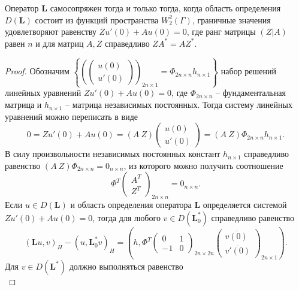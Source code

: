 \begin{theorem}
Оператор $\mathbf{L}$ самосопряжен тогда и только тогда, когда область определения $D(\mathbf{L})$ состоит из функций пространства $W_2^2(\Gamma)$, граничные значения удовлетворяют равенству $Z u'(0) + A u(0) = 0$, где ранг матрицы $(Z|A)$ равен $n$ и для матриц $A, Z$ справедливо $Z A^* = A Z^*$.
\end{theorem}
\begin{proof}
Обозначим $\left\{ \left( 
\begin{pmatrix}
           u(0) \\
           u'(0) 
\end{pmatrix}
\right)_{2n \times 1} = \Phi_{2n \times n} h_{n \times 1}
\right\}$ набор решений линейных уравнений $Z u'(0) + A u(0) = 0$, где $\Phi_{2n \times n}$ -- фундаментальная матрица и $h_{n \times 1}$ -- матрица независимых постоянных. Тогда систему линейных уравнений можно переписать в виде 
$$ 0 = Z u'(0) + A u(0) = \left( A \  Z \right) \begin{pmatrix}
           u(0) \\
           u'(0) 
\end{pmatrix} = 
 \left( A \  Z \right) \Phi_{2n \times n} h_{n \times 1}.$$ В силу произвольности независимых постоянных констант $h_{n \times 1}$ справедливо равенство $ \left( A \  Z \right) \Phi_{2n \times n} = 0_{n \times n}$, из которого можно получить соотношение 
\begin{equation}\Phi^T \begin{pmatrix}
         A^T \\
	Z^T 
\end{pmatrix}_{2n \times n} = 0_{n\times n}.
\label{eq:ch4:eq1}
\end{equation}
Если $u \in D(\mathbf{L})$ и область определения оператора $\mathbf{L}$ определяется системой $Z u'(0) + A u(0) = 0$, тогда для любого $v \in D(\mathbf{L}_0^*)$ справедливо равенство 
$$\left( \mathbf{L} u, v\right)_H - \left( u, \mathbf{L}_0^* v\right)_H = \left( h, \Phi^T 
\begin{pmatrix}
           0 & 1 \\
           -1 & 0
\end{pmatrix}_{2n \times 2n} 
\begin{pmatrix}
           \overline{v(0)} \\
           \overline{v'(0)}
\end{pmatrix}_{2n \times 1} \right).$$
Для $v \in D(\mathbf{L}^*)$ должно выполняться равенство 
\begin{equation}

\end{equation}
\end{proof}
